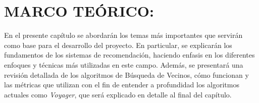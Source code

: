\chapter{MARCO TEÓRICO: }

En el presente capítulo se abordarán los temas más importantes que servirán como base para el desarrollo del proyecto. En particular, se explicarán los fundamentos de los sistemas de recomendación, haciendo enfasis en los diferentes enfoques y técnicas más utilizadas en este campo. Además, se presentará una revisión detallada de los algoritmos de Búsqueda de Vecinos, cómo funcionan y las métricas que utilizan con el fin de entender a profundidad los algoritmos actuales como \textit{Voyager}, que será explicado en detalle al final del capítulo.



\newpage
\thispagestyle{plain}
\vspace*{0.2cm}

